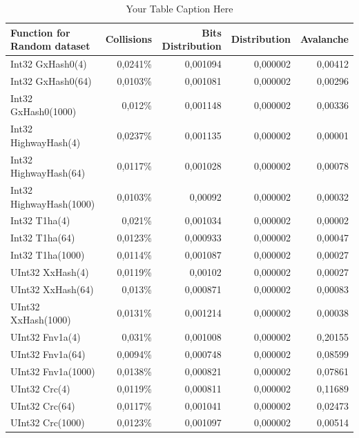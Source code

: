 \documentclass[10pt]{article}
\begin{document}
\begin{table}[H]
\centering
\begin{tabular}{|l|r|r|r|r|}
\hline
\textbf{Function for Random dataset} & \textbf{Collisions} & \textbf{Bits Distribution} & \textbf{Distribution} & \textbf{Avalanche} \\
\hline
Int32 GxHash0(4)            & 0,0241\% & 0,001094  & 0,000002 & 0,00412 \\
Int32 GxHash0(64)           & 0,0103\% & 0,001081  & 0,000002 & 0,00296 \\
Int32 GxHash0(1000)         & 0,012\%  & 0,001148  & 0,000002 & 0,00336 \\
Int32 HighwayHash(4)        & 0,0237\% & 0,001135  & 0,000002 & 0,00001 \\
Int32 HighwayHash(64)       & 0,0117\% & 0,001028  & 0,000002 & 0,00078 \\
Int32 HighwayHash(1000)     & 0,0103\% & 0,00092   & 0,000002 & 0,00032 \\
Int32 T1ha(4)               & 0,021\%  & 0,001034  & 0,000002 & 0,00002 \\
Int32 T1ha(64)              & 0,0123\% & 0,000933  & 0,000002 & 0,00047 \\
Int32 T1ha(1000)            & 0,0114\% & 0,001087  & 0,000002 & 0,00027 \\
UInt32 XxHash(4)            & 0,0119\% & 0,00102   & 0,000002 & 0,00027 \\
UInt32 XxHash(64)           & 0,013\%  & 0,000871  & 0,000002 & 0,00083 \\
UInt32 XxHash(1000)         & 0,0131\% & 0,001214  & 0,000002 & 0,00038 \\
UInt32 Fnv1a(4)             & 0,031\%  & 0,001008  & 0,000002 & 0,20155 \\
UInt32 Fnv1a(64)            & 0,0094\% & 0,000748  & 0,000002 & 0,08599 \\
UInt32 Fnv1a(1000)          & 0,0138\% & 0,000821  & 0,000002 & 0,07861 \\
UInt32 Crc(4)               & 0,0119\% & 0,000811  & 0,000002 & 0,11689 \\
UInt32 Crc(64)              & 0,0117\% & 0,001041  & 0,000002 & 0,02473 \\
UInt32 Crc(1000)            & 0,0123\% & 0,001097  & 0,000002 & 0,00514 \\
\hline
\end{tabular}
\caption{Your Table Caption Here}
\label{tab:my_label}
\end{table}
    
\end{document}
